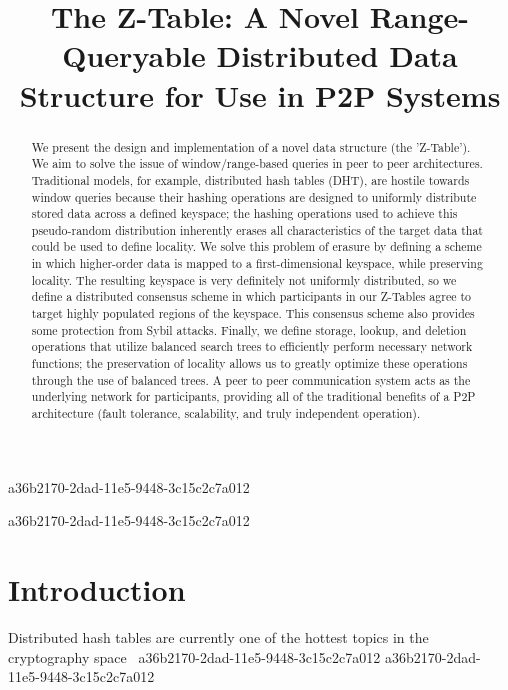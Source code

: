 \documentclass[12pt]{article}
\title{The Z-Table: A Novel Range-Queryable Distributed Data Structure for Use in P2P Systems}
\begin{document}
\maketitle

a36b2170-2dad-11e5-9448-3c15c2c7a012\begin{abstract}
We present the design and implementation of a novel data structure (the 'Z-Table'). We aim to solve the issue of window/range-based queries in peer to peer architectures. Traditional models, for example,  distributed hash tables (DHT), are hostile towards window queries because their hashing operations are designed to uniformly distribute stored data across a defined keyspace; the hashing operations used to achieve this pseudo-random distribution inherently erases all characteristics of the target data that could be used to define locality. We solve this problem of erasure by defining a scheme in which higher-order data is mapped to a first-dimensional keyspace, while preserving locality. The resulting keyspace is very definitely not uniformly distributed, so we define a distributed consensus scheme in which participants in our Z-Tables agree to target highly populated regions of the keyspace. This consensus scheme also provides some protection from Sybil attacks. Finally, we define storage, lookup, and deletion operations that utilize balanced search trees to efficiently perform necessary network functions; the preservation of locality allows us to greatly optimize these operations through the use of balanced trees. A peer to peer communication system acts as the underlying network for participants, providing all of the traditional benefits of a P2P architecture (fault tolerance, scalability, and truly independent operation).
\end{abstract}

a36b2170-2dad-11e5-9448-3c15c2c7a012
\newpage
\section{Introduction}
Distributed hash tables are currently one of the hottest topics in the cryptography space~\cite{Stoica:2001dj,Rowstron:2001ea,Ratnasamy:2001wn}
a36b2170-2dad-11e5-9448-3c15c2c7a012
a36b2170-2dad-11e5-9448-3c15c2c7a012\printbibliography
\end{document}
